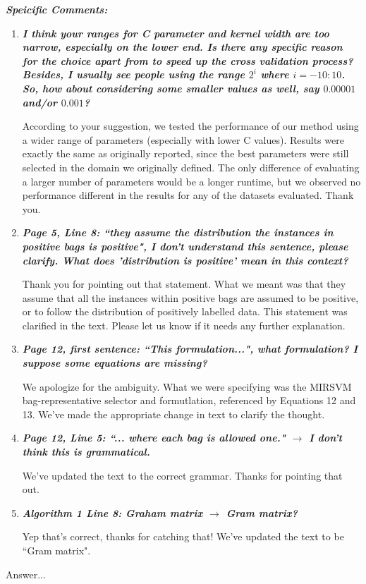 \documentclass[a4paper,notitlepage]{article}
\begin{document}
\noindent \textbf{\textit{Speicific Comments:}}
\begin{enumerate}
\item \textbf{\textit{I think your ranges for C parameter and kernel width are too narrow, especially on the lower end. Is there any specific reason for the choice apart from to speed up the cross validation process? Besides, I usually see people using the range $2^i$ where $i = -10:10$. So, how about considering some smaller values as well, say $0.00001$ and/or $0.001$?}}

\medskip

\noindent According to your suggestion, we tested the performance of our method using a wider range of parameters (especially with lower C values). Results were exactly the same as originally reported, since the best parameters were still selected in the domain we originally defined. The only difference of evaluating a larger number of parameters would be a longer runtime, but we observed no performance different in the results for any of the datasets evaluated. Thank you.

\item \textbf{\textit{Page 5, Line 8: ``they assume the distribution the instances in positive bags is positive", I don't understand this sentence, please clarify. What does 'distribution is positive' mean in this context?}}

\medskip

\noindent Thank you for pointing out that statement. What we meant was that they assume that all the instances within positive bags are assumed to be positive, or to follow the distribution of positively labelled data. This statement was clarified in the text. Please let us know if it needs any further explanation.

\item \textbf{\textit{Page 12, first sentence: ``This formulation...", what formulation? I suppose some equations are missing?}}

\medskip

\noindent We apologize for the ambiguity. What we were specifying was the MIRSVM bag-representative selector and formutlation, referenced by Equations 12 and 13. We've made the appropriate change in text to clarify the thought. 

\item \textbf{\textit{Page 12, Line 5: ``... where each bag is allowed one." $\rightarrow$ I don't think this is grammatical.}}

\medskip

\noindent We've updated the text to the correct grammar. Thanks for pointing that out.

\item \textbf{\textit{Algorithm 1 Line 8: Graham matrix $\rightarrow$ Gram matrix?}}

\medskip

\noindent Yep that's correct, thanks for catching that! We've updated the text to be ``Gram matrix".

\end{enumerate}

\medskip

\noindent Answer...
\end{document}
